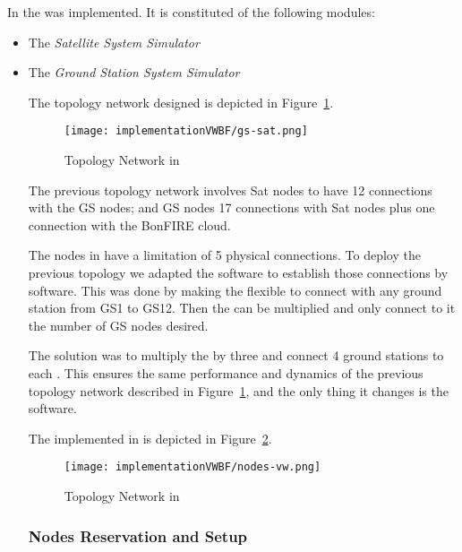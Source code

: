 In \vw the \sss was implemented. It is constituted of the
following modules:
\begin{itemize}
\item The \emph{Satellite System Simulator}
\item The \emph{Ground Station System Simulator}

The topology network designed is depicted in Figure~\ref{fig:impl-topology-vw}.

\begin{figure}[!h]
\begin{center}
\texttt{[image: implementationVWBF/gs-sat.png]}

\caption{Topology Network in \vw}
\label{fig:impl-topology-vw}
\end{center}
\end{figure}



The previous topology network involves Sat nodes to have 12 connections with the GS nodes; and GS nodes 17 connections with Sat nodes plus one connection with the BonFIRE cloud.

The nodes in \vw have a limitation of 5 physical connections. To deploy the previous
topology we adapted the \sss software to establish those connections by software. This was
done by making the \satss flexible to connect with any ground station from GS1 to GS12. Then the \satss can be multiplied and only connect to it the number of GS nodes desired. 

The solution was to multiply the \satss by three and connect 4 ground stations to each \satss. This ensures the same performance and dynamics of the previous topology network described in Figure~\ref{fig:impl-topology-vw}, and the only thing it changes is the software.

The \sss implemented in \vw is depicted in Figure~\ref{fig:impl-nodes-vw}.

\begin{figure}[!h]
\begin{center}
\texttt{[image: implementationVWBF/nodes-vw.png]}

\caption{Topology Network in \vw}
\label{fig:impl-nodes-vw}
\end{center}
\end{figure}



\subsubsection{Nodes Reservation and Setup}



\end{itemize}
